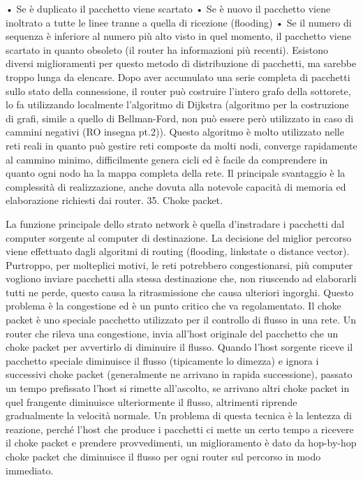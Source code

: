 •	Se è duplicato il pacchetto viene scartato
•	Se è nuovo il pacchetto viene inoltrato a tutte le linee tranne a quella di ricezione (flooding)
•	Se il numero di sequenza è inferiore al numero più alto visto in quel momento, il pacchetto viene scartato in quanto obsoleto (il router ha informazioni più recenti).
Esistono diversi miglioramenti per questo metodo di distribuzione di pacchetti, ma sarebbe troppo lunga da elencare.
Dopo aver accumulato una serie completa di pacchetti sullo stato della connessione, il router può costruire l’intero grafo della sottorete, lo fa utilizzando localmente l’algoritmo di Dijkstra (algoritmo per la costruzione di grafi, simile a quello di Bellman-Ford, non può essere però utilizzato in caso di cammini negativi (RO insegna pt.2)).
Questo algoritmo è molto utilizzato nelle reti reali in quanto può gestire reti composte da molti nodi, converge rapidamente al cammino minimo, difficilmente genera cicli ed è facile da comprendere in quanto ogni nodo ha la mappa completa della rete. Il principale svantaggio è la complessità di realizzazione, anche dovuta alla notevole capacità di memoria ed elaborazione richiesti dai router.
35.	Choke packet.

La funzione principale dello strato network è quella d’instradare i pacchetti dal computer sorgente al computer di destinazione. La decisione del miglior percorso viene effettuato dagli algoritmi di routing (flooding, linkstate o distance vector). Purtroppo, per molteplici motivi, le reti potrebbero congestionarsi, più computer vogliono inviare pacchetti alla stessa destinazione che, non riuscendo ad elaborarli tutti ne perde, questo causa la ritrasmissione che causa ulteriori ingorghi. Questo problema è la congestione ed è un punto critico che va regolamentato.
Il choke packet è uno speciale pacchetto utilizzato per il controllo di flusso in una rete. Un router che rileva una congestione, invia all’host originale del pacchetto che un choke packet per avvertirlo di diminuire il flusso. Quando l’host sorgente riceve il pacchetto speciale diminuisce il flusso (tipicamente lo dimezza) e ignora i successivi choke packet (generalmente ne arrivano in rapida successione), passato un tempo prefissato l’host si rimette all’ascolto, se arrivano altri choke packet in quel frangente diminuisce ulteriormente il flusso, altrimenti riprende gradualmente la velocità normale.
Un problema di questa tecnica è la lentezza di reazione, perché l’host che produce i pacchetti ci mette un certo tempo a ricevere il choke packet e prendere provvedimenti, un miglioramento è dato da hop-by-hop choke packet che diminuisce il flusso per ogni router sul percorso in modo immediato.
 

